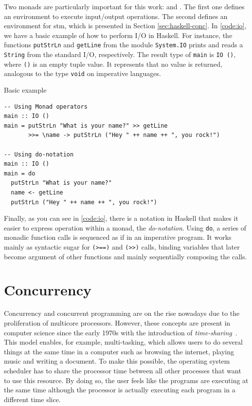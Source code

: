Two monads are particularly important for this work: \IO and \STM. The first one defines an environment to execute input/output operations. The second defines an environment for \acl{stm}, which is presented in Section \ref{sec:haskell-conc}. In \autoref{code:io}, we have a basic example of how to perform I/O in Haskell. For instance, the functions \texttt{putStrLn} and \texttt{getLine} from the module \texttt{System.IO} prints and reads a \texttt{String} from the standard I/O, respectively. The result type of \texttt{main} is \texttt{IO ()}, where \texttt{()} is an empty tuple value. It represents that no value is returned, analogous to the type \texttt{void} on imperative languages.

\begin{listing}
  \caption{Basic \IO example}
  \begin{verbatim}
-- Using Monad operators
main :: IO ()
main = putStrLn "What is your name?" >> getLine
       >>= \name -> putStrLn ("Hey " ++ name ++ ", you rock!")

-- Using do-notation
main :: IO ()
main = do
  putStrLn "What is your name?"
  name <- getLine
  putStrLn ("Hey " ++ name ++ ", you rock!")
  \end{verbatim}
  \label{code:io}
\end{listing}

Finally, as you can see in \autoref{code:io}, there is a notation in Haskell that makes it easier to express operation within a monad, the \emph{do-notation}. Using \texttt{do}, a series of monadic function calls is sequenced as if in an imperative program. It works mainly as syntactic sugar for \texttt{(>==)} and \texttt{(>>)} calls, binding variables that later become argument of other functions and mainly sequentially composing the calls.


\section{Concurrency}\label{sec:conc}
Concurrency and concurrent programming are on the rise nowadays due to the proliferation of multicore processors. However, these concepts are present in computer science since the early 1970s with the introduction of \emph{time-sharing}~\cite{lea:2006}. This model enables, for example, multi-tasking, which allows users to do several things at the same time in a computer such as browsing the internet, playing music and writing a document. To make this possible, the operating system scheduler has to share the processor time between all other processes that want to use this resource. By doing so, the user feels like the programs are executing at the same time although the processor is actually executing each program in a different time slice.

